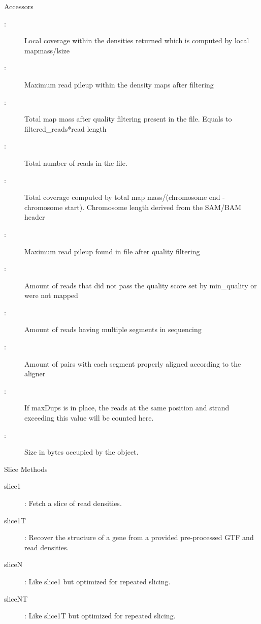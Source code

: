 \documentclass[letterpaper]{book}
\begin{document}
\begin{Section}{Accessors}
\begin{description}
\item[:] Local coverage within the densities returned which is computed by local mapmass/lsize
\item[:] Maximum read pileup within the density maps after filtering
\item[:] Total map mass after quality filtering present in the file. Equals to filtered\_reads*read length
\item[:] Total number of reads in the file.
\item[:] Total coverage computed by total map mass/(chromosome end - chromosome start). Chromosome length derived from the SAM/BAM header
\item[:] Maximum read pileup found in file after quality filtering
\item[:] Amount of reads that did not pass the quality score set by min\_quality or were not mapped
\item[:] Amount of reads having multiple segments in sequencing
\item[:] Amount of pairs with each segment properly aligned according to the aligner
\item[:] If maxDups is in place, the reads at the same position and strand exceeding this value will be counted here.   
\item[:] Size in bytes occupied by the object.   


\end{description}

\end{Section}
%
\begin{Section}{Slice Methods}
\begin{description}

\item[slice1] : Fetch a slice of read densities. 
\item[slice1T] : Recover the structure of a gene from a provided pre-processed GTF and read densities. 
\item[sliceN] : Like slice1 but optimized for repeated slicing. 
\item[sliceNT] : Like slice1T but optimized for repeated slicing. 

\end{description}

\end{Section}
\end{document}
